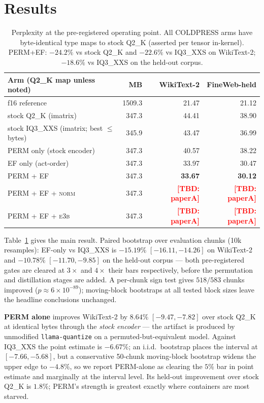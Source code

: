 \documentclass[11pt]{article}
\newcommand{\TBD}[1]{\textcolor{red}{\textbf{[TBD: #1]}}}
\begin{document}
\section{Results}
\label{sec:results}

\begin{table}[t]
\centering
\small
\begin{tabular}{lrrr}
\toprule
Arm (Q2\_K map unless noted) & MB & WikiText-2 & FineWeb-held \\
\midrule
f16 reference & 1509.3 & 21.47 & 21.12 \\
\midrule
stock Q2\_K (imatrix) & 347.3 & 44.41 & 38.90 \\
stock IQ3\_XXS (imatrix; best $\leq$ bytes) & 345.9 & 43.47 & 36.99 \\
\midrule
PERM only (stock encoder) & 347.3 & 40.57 & 38.22 \\
EF only (act-order) & 347.3 & 33.97 & 30.47 \\
PERM + EF & 347.3 & \textbf{33.67} & \textbf{30.12} \\
PERM + EF + \textsc{norm} & 347.3 & \TBD{paperA} & \TBD{paperA} \\
PERM + EF + \textsc{e3b} & 347.3 & \TBD{paperA} & \TBD{paperA} \\
\bottomrule
\end{tabular}
\caption{Perplexity at the pre-registered operating point. All COLDPRESS arms have
byte-identical type maps to stock Q2\_K (asserted per tensor in-kernel). PERM+EF:
$-24.2\%$ vs stock Q2\_K and $-22.6\%$ vs IQ3\_XXS on WikiText-2; $-18.6\%$ vs
IQ3\_XXS on the held-out corpus.}
\label{tab:main}
\end{table}

Table~\ref{tab:main} gives the main result. Paired bootstrap over evaluation chunks
(10k resamples): EF-only vs IQ3\_XXS is $-15.19\%$ $[-16.11, -14.26]$ on WikiText-2
and $-10.78\%$ $[-11.70, -9.85]$ on the held-out corpus --- both pre-registered gates
are cleared at $3\times$ and $4\times$ their bars respectively, before the permutation
and distillation stages are added. A per-chunk sign test gives $518/583$ chunks
improved ($p \approx 6\times10^{-89}$); moving-block bootstraps at all tested block
sizes leave the headline conclusions unchanged.

\textbf{PERM alone} improves WikiText-2 by $8.64\%$ $[-9.47, -7.82]$ over stock Q2\_K
at identical bytes through the \emph{stock encoder} --- the artifact is produced by
unmodified \texttt{llama-quantize} on a permuted-but-equivalent model. Against
IQ3\_XXS the point estimate is $-6.67\%$; an i.i.d.\ bootstrap places the interval at
$[-7.66, -5.68]$, but a conservative 50-chunk moving-block bootstrap widens the upper
edge to $-4.8\%$, so we report PERM-alone as clearing the $5\%$ bar in point estimate
and marginally at the interval level. Its held-out improvement over stock Q2\_K is
$1.8\%$; PERM's strength is greatest exactly where containers are most starved.
\end{document}
